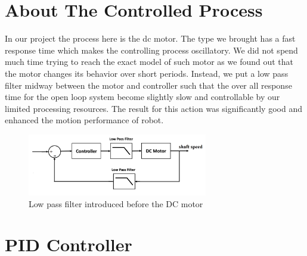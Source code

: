 \documentclass[12pt]{book}
\begin{document}
	\section{About The Controlled Process}
	In our project the process here is the dc motor. The type we brought has a fast response time which makes the controlling process oscillatory. We did not spend much time trying to reach the exact model of such motor as we found out that the motor changes its behavior over short periods. Instead, we put a low pass filter midway between the motor and controller such that the over all response time for the open loop system become slightly slow and controllable by our limited processing resources. The result for this action was significantly good and enhanced the motion performance of robot.  
	\begin{figure}
		\centering
		\includegraphics[width =0.7\textwidth]{Fig/lpf.png}
		\caption{Low pass filter introduced before the DC motor}
		\label{fig:lpf}
	\end{figure}

	\section{PID Controller}
	
\end{document}
